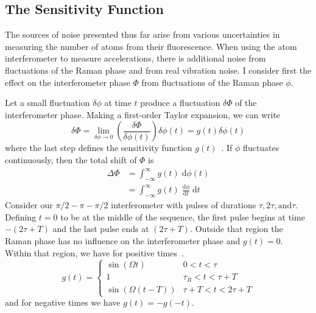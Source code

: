 \subsection{The Sensitivity Function}\label{subsec:sens_func}
The sources of noise presented thus far arise from various 
uncertainties in measuring the number of atoms from their
fluorescence. When using the atom interferometer to measure
accelerations, there is additional noise from fluctuations of the
Raman phase and from real vibration noise. I consider first the effect
on the interferometer phase $\Phi$ from fluctuations of the Raman
phase $\phi$.
\par\noindent
Let a small fluctuation $\delta \phi$ at time $t$ produce a
fluctuation $\delta \Phi$ of the interferometer phase. Making a
first-order Taylor expansion, we can write
\begin{equation}
  \delta \Phi = \lim_{\delta\phi \rightarrow 0} \left(\frac{\delta
  \Phi}{\delta \phi(t)}\right) \delta \phi(t) = g(t) \delta \phi(t)
\end{equation}
where the last step defines the sensitivity function
$g(t)$~\cite{Dick1987}. If $\phi$ fluctuates continuously, then the
total shift of $\Phi$ is
\begin{align}
  \Delta\Phi &= \int_{-\infty}^\infty g(t)\;\mathrm{d}\phi(t)
  \nonumber\\
  &= \int_{-\infty}^\infty g(t)\;\frac{\mathrm{d}\phi}{\mathrm{d} t}\;
  \mathrm{d}t
  \label{eq:phase_contrib}
\end{align}
Consider our \(\pi/2-\pi-\pi/2\) interferometer with pulses 
of durations \(\tau, 2\tau, \text{and} \tau\). Defining \(t=0\) to be at
the middle of the sequence, the first pulse begins at time $-(2 \tau +
T)$ and the last pulse ends at $(2\tau + T)$. Outside that region the
Raman phase has no influence on the interferometer phase and $g(t) =
0$. Within that region, we have for positive times~\cite{Cheinet2008}.
\begin{equation}
    g(t) = 
    \begin{cases}
      \sin ( \Omega t) & 0<t<\tau  \\
      1 & \tau_R <t<\tau +T \\
      \sin (\Omega  (t-T)) & \tau +T<t<2 \tau +T
  \end{cases}
\label{eq:sensitivity_interferometer}
\end{equation}
and for negative times we have $g(t) = - g(-t)$.
